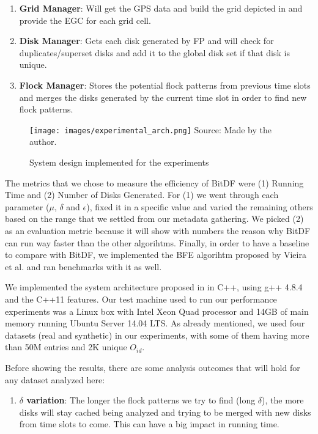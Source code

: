 {\begin{enumerate}
    \item \textbf{Grid Manager}: Will get the GPS data and build the grid depicted in  and provide the
        EGC for each grid cell.
    \item \textbf{Disk Manager}: Gets each disk generated by FP and will check for duplicates/superset disks and add it
        to the global disk set if that disk is unique.
    \item \textbf{Flock Manager}: Stores the potential flock patterns from previous time slots and merges the disks
        generated by the current time slot in order to find new flock patterns.
\end{enumerate}

\begin{figure}[h!]
    \centering
    \caption{System design implemented for the experiments}
    \texttt{[image: images/experimental\_arch.png]}
    \footnotesize{Source: Made by the author.}
    \label{fig:experimental_arch}
\end{figure}

The metrics that we chose to measure the efficiency of BitDF were (1) Running Time and (2) Number of Disks Generated.
For (1) we went through each parameter ($\mu$, $\delta$ and $\epsilon$), fixed it in a specific value and varied the
remaining others based on the range that we settled from our metadata gathering. We picked (2) as an evaluation metric
because it will show with numbers the reason why BitDF can run way faster than the other algorihtms. Finally, in order
to have a baseline to compare with BitDF, we implemented the BFE algorihtm proposed by Vieira et al. \citep{vieira} and
ran benchmarks with it as well.

We implemented the system architecture proposed in  in C++, using g++ 4.8.4 and the C++11
\citep{cpp11spec} features. Our test machine used to run our performance experiments was a Linux box with Intel Xeon
Quad processor and 14GB of main memory running Ubuntu Server 14.04 LTS. As already mentioned, we used four datasets
(real and synthetic) in our experiments, with some of them having more than 50M entries and 2K unique $O_{id}$.

Before showing the results, there are some analysis outcomes that will hold for any dataset analyzed here:

\begin{enumerate}
    \item \textbf{$\delta$ variation}: The longer the flock patterns we try to find (long $\delta$), the more disks will
        stay cached being analyzed and trying to be merged with new disks from time slots to come. This can have a big
        impact in running time.\label{sssec:lvariation}


\end{enumerate}}

